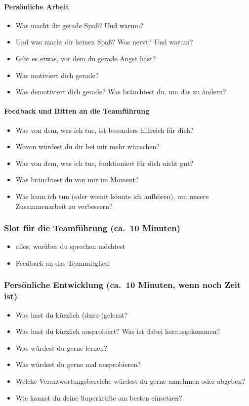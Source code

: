 \paragraph{Persönliche Arbeit}
\begin{itemize}
 \item Was macht dir gerade Spaß? Und warum?
 \item Und was macht dir keinen Spaß? Was nervt? Und warum?
 \item Gibt es etwas, vor dem du gerade Angst hast?
 \item Was motiviert dich gerade?
 \item Was demotiviert dich gerade? Was bräuchtest du, um das zu ändern?
\end{itemize}

\paragraph{Feedback und Bitten an die Teamführung}
\begin{itemize}
 \item Was von dem, was ich tue, ist besonders hilfreich für dich?
 \item Wovon würdest du dir bei mir mehr wünschen?
 \item Was von dem, was ich tue, funktioniert für dich nicht gut?
 \item Was bräuchtest du von mir im Moment?
 \item Was kann ich tun (oder womit könnte ich aufhören), um unsere Zusammenarbeit zu verbessern?
\end{itemize}


\subsubsection{Slot für die Teamführung (ca.~10 Minuten)}
\begin{itemize}
 \item alles, worüber du sprechen möchtest
 \item Feedback an das Teammitglied
\end{itemize}


\subsubsection{Persönliche Entwicklung (ca.~10 Minuten, wenn noch Zeit ist)}
\begin{itemize}
 \item Was hast du kürzlich (dazu-)gelernt?
 \item Was hast du kürzlich ausprobiert? Was ist dabei herausgekommen?
 \item Was würdest du gerne lernen?
 \item Was würdest du gerne mal ausprobieren?
 \item Welche Verantwortungsbereiche würdest du gerne annehmen oder abgeben?
 \item Wie kannst du deine Superkräfte am besten einsetzen?
\end{itemize}

